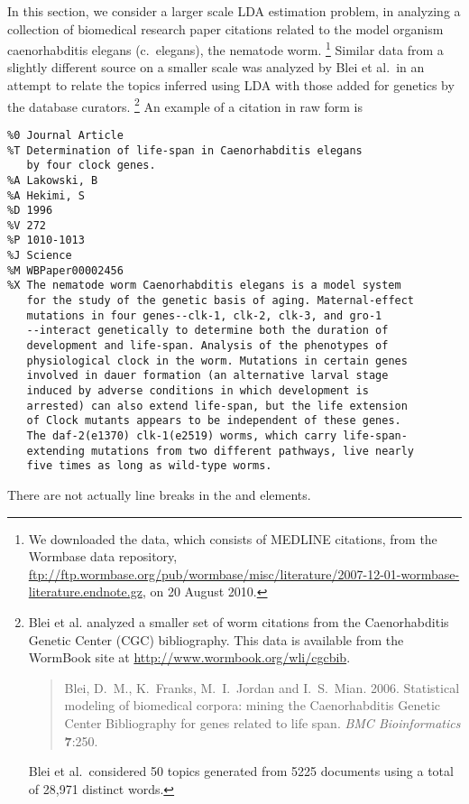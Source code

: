 In this section, we consider a larger scale LDA estimation problem, in
analyzing a collection of biomedical research paper citations related
to the model organism caenorhabditis elegans (c.~elegans), the
nematode worm.%
%
\footnote{\label{footnote:lda-wormbase-data} We downloaded the data,
  which consists of MEDLINE citations, from the Wormbase data
  repository,
  \url{ftp://ftp.wormbase.org/pub/wormbase/misc/literature/2007-12-01-wormbase-literature.endnote.gz},
  on 20 August 2010.}
%
Similar data from a slightly different source on a smaller scale
was analyzed by Blei et al.\ in an attempt to relate the topics
inferred using LDA with those added for genetics by the database
curators.%
%
\footnote{Blei et al.  analyzed a smaller set of worm citations from
  the Caenorhabditis Genetic Center (CGC) bibliography.  This data is
  available from the WormBook site at \url{http://www.wormbook.org/wli/cgcbib}.  
\begin{quote}
Blei, D.~M., K.~Franks, M.~I.~Jordan and
  I.~S.~Mian. 2006. Statistical modeling of biomedical corpora: mining
  the Caenorhabditis Genetic Center Bibliography for genes related to
  life span. {\it BMC Bioinformatics} {\bf 7}:250.
\end{quote}
Blei et al.\ considered 50 topics generated from 5225 documents using
a total of 28,971 distinct words.  }
%
An example of a citation in raw form is
%
\begin{verbatim}
%0 Journal Article
%T Determination of life-span in Caenorhabditis elegans 
   by four clock genes.
%A Lakowski, B
%A Hekimi, S
%D 1996
%V 272
%P 1010-1013
%J Science
%M WBPaper00002456
%X The nematode worm Caenorhabditis elegans is a model system 
   for the study of the genetic basis of aging. Maternal-effect
   mutations in four genes--clk-1, clk-2, clk-3, and gro-1
   --interact genetically to determine both the duration of 
   development and life-span. Analysis of the phenotypes of
   physiological clock in the worm. Mutations in certain genes 
   involved in dauer formation (an alternative larval stage
   induced by adverse conditions in which development is 
   arrested) can also extend life-span, but the life extension 
   of Clock mutants appears to be independent of these genes. 
   The daf-2(e1370) clk-1(e2519) worms, which carry life-span-
   extending mutations from two different pathways, live nearly 
   five times as long as wild-type worms.
\end{verbatim}
%
There are not actually line breaks in the  and  elements.

